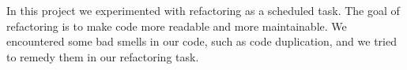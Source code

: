In this project we experimented with refactoring as a scheduled task. The goal of refactoring is to make code more readable and more maintainable. We encountered some bad smells in our code, such as code duplication, and we tried to remedy them in our refactoring task. %